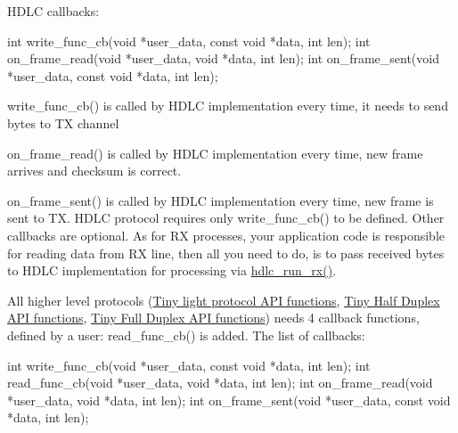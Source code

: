 H\+D\+LC callbacks\+: 
\begin{DoxyCode}
\textcolor{keywordtype}{int} write\_func\_cb(\textcolor{keywordtype}{void} *user\_data, \textcolor{keyword}{const} \textcolor{keywordtype}{void} *data, \textcolor{keywordtype}{int} len);
\textcolor{keywordtype}{int} on\_frame\_read(\textcolor{keywordtype}{void} *user\_data, \textcolor{keywordtype}{void} *data, \textcolor{keywordtype}{int} len);
\textcolor{keywordtype}{int} on\_frame\_sent(\textcolor{keywordtype}{void} *user\_data, \textcolor{keyword}{const} \textcolor{keywordtype}{void} *data, \textcolor{keywordtype}{int} len);
\end{DoxyCode}



\begin{DoxyItemize}
\item write\+\_\+func\+\_\+cb() is called by H\+D\+LC implementation every time, it needs to send bytes to TX channel
\item on\+\_\+frame\+\_\+read() is called by H\+D\+LC implementation every time, new frame arrives and checksum is correct.
\item on\+\_\+frame\+\_\+sent() is called by H\+D\+LC implementation every time, new frame is sent to TX. H\+D\+LC protocol requires only write\+\_\+func\+\_\+cb() to be defined. Other callbacks are optional. As for RX processes, your application code is responsible for reading data from RX line, then all you need to do, is to pass received bytes to H\+D\+LC implementation for processing via \hyperlink{group__HDLC__API_ga911a3f1cb32dd6cadd00223e0097642c}{hdlc\+\_\+run\+\_\+rx()}.
\end{DoxyItemize}

All higher level protocols (\hyperlink{group__LIGHT__API}{Tiny light protocol A\+PI functions}, \hyperlink{group__HALF__DUPLEX__API}{Tiny Half Duplex A\+PI functions}, \hyperlink{group__FULL__DUPLEX__API}{Tiny Full Duplex A\+PI functions}) needs 4 callback functions, defined by a user\+: read\+\_\+func\+\_\+cb() is added. The list of callbacks\+:


\begin{DoxyCode}
\textcolor{keywordtype}{int} write\_func\_cb(\textcolor{keywordtype}{void} *user\_data, \textcolor{keyword}{const} \textcolor{keywordtype}{void} *data, \textcolor{keywordtype}{int} len);
\textcolor{keywordtype}{int} read\_func\_cb(\textcolor{keywordtype}{void} *user\_data, \textcolor{keywordtype}{void} *data, \textcolor{keywordtype}{int} len);
\textcolor{keywordtype}{int} on\_frame\_read(\textcolor{keywordtype}{void} *user\_data, \textcolor{keywordtype}{void} *data, \textcolor{keywordtype}{int} len);
\textcolor{keywordtype}{int} on\_frame\_sent(\textcolor{keywordtype}{void} *user\_data, \textcolor{keyword}{const} \textcolor{keywordtype}{void} *data, \textcolor{keywordtype}{int} len);
\end{DoxyCode}


